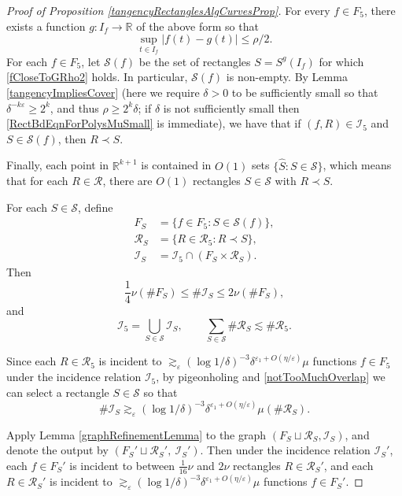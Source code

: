 \documentclass[letterpaper, reqno,11pt]{article}
\numberwithin{equation}{section}
\newcommand{\RR}{\mathbb{R}}
\newcommand{\eps}{\varepsilon}
\numberwithin{thm}{section}
\theoremstyle{remark}
\begin{document}
\begin{proof}[Proof of Proposition \ref{tangencyRectanglesAlgCurvesProp}]
For every $f\in F_5$, there exists a function $g\colon I_f\to\RR$ of the above form so that
\begin{equation}\label{fCloseToGRho2}
\sup_{t\in I_f}|f(t)-g(t)|\leq \rho/2.
\end{equation}
 For each $f\in F_5$, let $\mathcal{S}(f)$ be the set of rectangles $S = S^g(I_f)$ for which \eqref{fCloseToGRho2} holds. In particular,  $\mathcal{S}(f)$ is non-empty. By Lemma \ref{tangencyImpliesCover} (here we require $\delta>0$ to be sufficiently small so that $\delta^{-k\eps}\geq 2^k$, and thus  $\rho\geq 2^k\delta$; if $\delta$ is not sufficiently small then \eqref{RectBdEqnForPolysMuSmall} is immediate), we have that if $(f,R)\in\mathcal{I}_5$ and $S\in \mathcal{S}(f)$, then $R\prec S$. 

Finally, each point in $\RR^{k+1}$ is contained in $O(1)$ sets $\{\hat S\colon S\in\mathcal{S}\}$, which means that for each $R\in\mathcal{R}$, there are 
$O(1)$ rectangles $S\in\mathcal{S}$ with $R\prec S$.

For each $S\in\mathcal{S}$, define 
\begin{equation}
\begin{split}
F_S & =\{f\in F_5\colon S\in\mathcal{S}(f)\},\\
\mathcal{R}_S & = \{R\in\mathcal{R}_5\colon R\prec S\},\\
\mathcal{I}_S & = \mathcal{I}_5\cap (F_S\times \mathcal{R}_S).
\end{split}
\end{equation}
Then 
\begin{equation}\label{FSVsIS}
\frac{1}{4}\nu(\#F_S) \leq \#\mathcal{I}_S \leq 2\nu(\# F_S),
\end{equation}
and
\begin{equation}\label{notTooMuchOverlap}
\mathcal{I}_5 = \bigcup_{S\in\mathcal{S}}\mathcal{I}_S,\qquad \sum_{S\in\mathcal{S}}\#\mathcal{R}_S \lesssim \#\mathcal{R}_5.
\end{equation}

Since each $R\in\mathcal{R}_5$ is incident to $\gtrsim_\eps (\log1/\delta)^{-3}\delta^{\eps_1+O(\eta/\eps)}\mu$ functions $f\in F_5$ under the incidence relation $\mathcal{I}_5$, by pigeonholing and \eqref{notTooMuchOverlap} we can select a rectangle $S\in\mathcal{S}$ so that
\[
\#\mathcal{I}_S \gtrsim_\eps (\log1/\delta)^{-3}\delta^{\eps_1+O(\eta/\eps)}\mu(\#\mathcal{R}_S).
\]

Apply Lemma \ref{graphRefinementLemma} to the graph $(F_S\sqcup \mathcal{R}_S, \mathcal{I}_S)$, and denote the output by $(F_S'\sqcup \mathcal{R}_S',\ \mathcal{I}_S')$. Then under the incidence relation $\mathcal{I}_S'$, each $f\in F_S'$ is incident to between $\frac{1}{16}\nu$ and $2\nu$ rectangles $R\in\mathcal{R}_S'$, and each $R\in\mathcal{R}_S'$ is incident to $\gtrsim_\eps (\log1/\delta)^{-3}\delta^{\eps_1+O(\eta/\eps)}\mu$ functions $f\in F_S'$. 


\end{proof}
\end{document}
